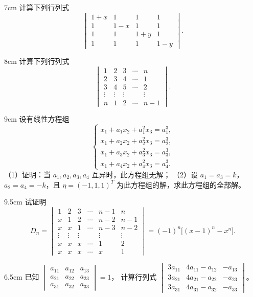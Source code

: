 \begin{problem}{}{7cm}
计算下列行列式
\[
\begin{vmatrix}
1+x&1&1&1\\
1&1-x&1&1\\
1&1&1+y&1\\
1&1&1&1-y
\end{vmatrix}.
\]
\end{problem}

\begin{problem}{}{8cm}
计算下列行列式
\[
\begin{vmatrix}
1&2&3&\cdots&n\\
2&3&4&\cdots&1\\
3&4&5&\cdots&2\\
\vdots&\vdots&\vdots&&\vdots\\
n&1&2&\cdots&n-1
\end{vmatrix}.
\]
\end{problem}

\begin{problem}{}{9cm}
设有线性方程组
\[
\begin{cases}
x_1+a_1x_2+a_1^{2}x_3=a_1^{3},\\
x_1+a_2x_2+a_2^{2}x_3=a_2^{3},\\
x_1+a_3x_2+a_3^{2}x_3=a_3^{3},\\
x_1+a_4x_2+a_4^{2}x_3=a_4^{3}.
\end{cases}
\]
（1）证明：当 $a_1,a_2,a_3,a_4$ 互异时，此方程组无解；
（2）设 $a_1=a_3=k$，$a_2=a_4=-k$，且 $\eta=(-1,1,1)^{T}$ 为此方程组的解，求此方程组的全部解。
\end{problem}

\begin{problem}{}{9.5cm}
试证明
\[
D_n=\begin{vmatrix}
1&2&3&\cdots&n-1&n\\
x&1&2&\cdots&n-2&n-1\\
x&x&1&\cdots&n-3&n-2\\
\vdots&\vdots&\vdots&&\vdots&\vdots\\
x&x&x&\cdots&1&2\\
x&x&x&\cdots&x&1
\end{vmatrix}=(-1)^{n}\bigl[(x-1)^{n}-x^{n}\bigr].
\]
\end{problem}

\begin{problem}{}{6.5cm}
已知
$\begin{vmatrix}a_{11}&a_{12}&a_{13}\\a_{21}&a_{22}&a_{23}\\a_{31}&a_{32}&a_{33}\end{vmatrix}=1$，
计算行列式
$\begin{vmatrix}3a_{11}&4a_{11}-a_{12}&-a_{13}\\3a_{21}&4a_{21}-a_{22}&-a_{23}\\3a_{31}&4a_{31}-a_{32}&-a_{33}\end{vmatrix}$。
\end{problem}

